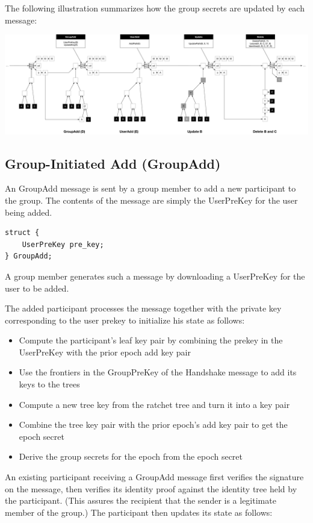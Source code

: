 \documentclass[11pt, oneside]{article}
\begin{document}
The following illustration summarizes how the group secrets are updated by each message:

\includegraphics[width=\textwidth]{summary}


\subsection{Group-Initiated Add (GroupAdd)}

An GroupAdd message is sent by a group member to add a new participant to the group.  The contents of the message are simply the UserPreKey for the user being added.  

\begin{verbatim}
struct {
    UserPreKey pre_key;
} GroupAdd;
\end{verbatim}

A group member generates such a message by downloading a UserPreKey for the user to be added.

The added participant processes the message together with the private key corresponding to the user prekey to initialize his state as follows:

\begin{itemize}
\item{Compute the participant's leaf key pair by combining the prekey in the UserPreKey with the prior epoch add key pair}
\item{Use the frontiers in the GroupPreKey of the Handshake message to add its keys to the trees}
\item{Compute a new tree key from the ratchet tree and turn it into a key pair}
\item{Combine the tree key pair with the prior epoch's add key pair to get the epoch secret}
\item{Derive the group secrets for the epoch from the epoch secret}
\end{itemize}

An existing participant receiving a GroupAdd message first verifies the signature on the message, then verifies its identity proof against the identity tree held by the participant.  (This assures the recipient that the sender is a legitimate member of the group.)  The participant then updates its state as follows:
\end{document}
